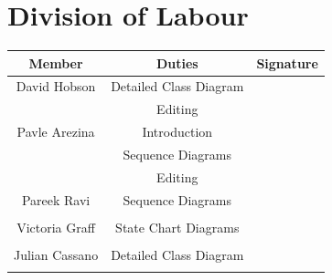 \documentclass[12pt, titlepage]{article}
\begin{document}
\section{Division of Labour}
\label{sec:division_of_labour}
\begin{table}[h!]
\centering


\begin{tabular}{|c|c|c|}
\hline
{\bf Member} & {\bf Duties}&{\bf Signature}\\
\hline
{David Hobson} & {Detailed Class Diagram} & { }\\
{} & {Editing}  & {}\\
\hline
{Pavle Arezina} & {Introduction} & {}\\
{} & {Sequence Diagrams} & {}\\
{} & {Editing} & {}\\
\hline
{Pareek Ravi} & {Sequence Diagrams} & {}\\
{} & {} & {}\\
\hline
{Victoria Graff} & {State Chart Diagrams} & {}\\
{} & {} & {}\\
\hline
{Julian Cassano} & {Detailed Class Diagram} & {}\\
{} & {} & {}\\
\hline
\end{tabular}

\end{table}
\end{document}

